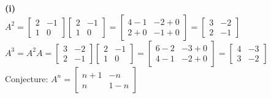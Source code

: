 \begin{solution}
\textbf{(i)} \\
$A^2 = \begin{bmatrix} 2 & -1 \\ 1 & 0 \end{bmatrix} \begin{bmatrix} 2 & -1 \\ 1 & 0 \end{bmatrix} = \begin{bmatrix} 4-1 & -2+0 \\ 2+0 & -1+0 \end{bmatrix} = \begin{bmatrix} 3 & -2 \\ 2 & -1 \end{bmatrix}$ \\
$A^3 = A^2 A = \begin{bmatrix} 3 & -2 \\ 2 & -1 \end{bmatrix} \begin{bmatrix} 2 & -1 \\ 1 & 0 \end{bmatrix} = \begin{bmatrix} 6-2 & -3+0 \\ 4-1 & -2+0 \end{bmatrix} = \begin{bmatrix} 4 & -3 \\ 3 & -2 \end{bmatrix}$ \\
Conjecture: \textbf{$A^n = \begin{bmatrix} n+1 & -n \\ n & 1-n \end{bmatrix}$}


\end{solution}
